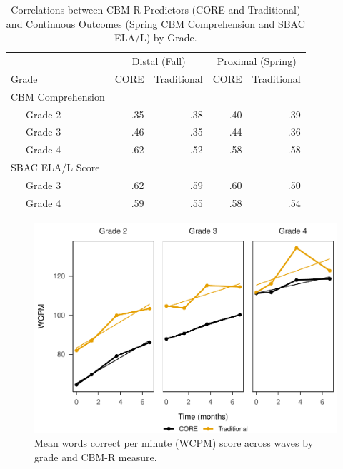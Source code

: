 \documentclass[
  english,
  man, fleqn, noextraspace]{apa6}
\begin{document}
\begin{center}
\begin{ThreePartTable}
\end{ThreePartTable}
\end{center}



\begin{table}[tbp]

\begin{center}
\begin{threeparttable}

\caption{\label{tab:tbl-cor}Correlations between CBM-R Predictors (CORE and Traditional) and Continuous Outcomes (Spring CBM Comprehension and SBAC ELA/L) by Grade.}

\begin{tabular}{lrrrr}
\toprule
 & \multicolumn{2}{c}{Distal (Fall)} & \multicolumn{2}{c}{Proximal (Spring)} \\
\cmidrule(r){2-3} \cmidrule(r){4-5}
Grade & \multicolumn{1}{c}{CORE} & \multicolumn{1}{c}{Traditional} & \multicolumn{1}{c}{CORE} & \multicolumn{1}{c}{Traditional}\\
\midrule
CBM Comprehension &  &  &  & \\
\ \ \ Grade 2 & .35 & .38 & .40 & .39\\
\ \ \ Grade 3 & .46 & .35 & .44 & .36\\
\ \ \ Grade 4 & .62 & .52 & .58 & .58\\
SBAC ELA/L Score &  &  &  & \\
\ \ \ Grade 3 & .62 & .59 & .60 & .50\\
\ \ \ Grade 4 & .59 & .55 & .58 & .54\\
\bottomrule
\end{tabular}

\end{threeparttable}
\end{center}

\end{table}



\begin{figure}
\centering
\includegraphics{demo_files/figure-latex/fig-means-1.pdf}
\caption{\label{fig:fig-means}Mean words correct per minute (WCPM) score across waves by grade and CBM-R measure.}
\end{figure}
\end{document}
